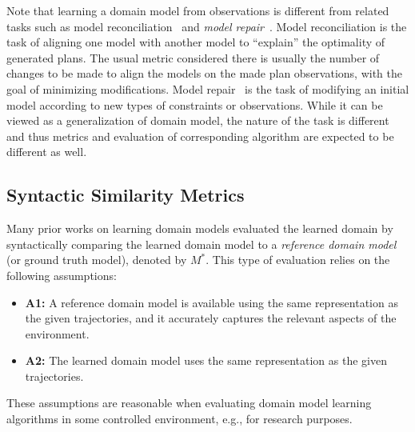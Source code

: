 \documentclass{article}
\theoremstyle{definition}
\theoremstyle{remark}
\newcommand{\realm}{{\ensuremath{M^*}}\xspace}
\newif\ifaddcomments
\newcommand{\roni}[1]{\ifaddcomments{\textcolor{red}{[Roni: #1]}}\fi}
\begin{document}
Note that learning a domain model from observations is different from related tasks such as model reconciliation~\citep[inter alia]{ChakrabortiSZK17,SreedharanHMK19} and \emph{model repair}~\citep{bercher2025aSurvey}. 
Model reconciliation is the task of aligning one model with another model to ``explain'' the optimality of generated plans. 
The usual metric considered there is usually the number of changes to be made to align the models on the made plan observations, with the goal of minimizing modifications.
Model repair~\cite{bercher2025aSurvey} is the task of modifying an initial model according to new types of constraints or observations. While it can be viewed as a generalization of domain model, the nature of the task is different and thus metrics and evaluation of corresponding algorithm are expected to be different as well.\roni{I'm not super happy with my last 2 sentences.}  






\subsection{Syntactic Similarity Metrics}
Many prior works on learning domain models evaluated the learned domain by syntactically comparing the learned domain model to a \emph{reference domain model} (or ground truth model), denoted by $\realm$. This type of evaluation relies on the following assumptions:
\begin{itemize}
    \item \textbf{A1:} A reference domain model 
    is available using the same representation as the given trajectories, and it accurately captures the relevant aspects of the environment. 
    \item \textbf{A2:} The learned domain model uses the same representation as the given trajectories. 
\end{itemize}
These assumptions are reasonable when evaluating domain model learning algorithms in some controlled environment, e.g., for research purposes. 
\end{document}
